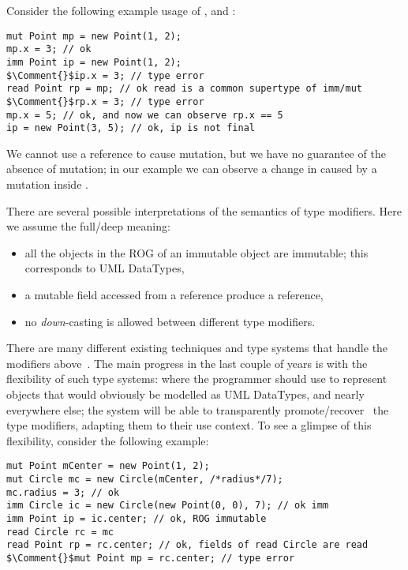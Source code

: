 \noindent Consider the following  example usage of \Q@mut@, \Q@imm@ and \Q@read@:
\begin{lstlisting}
mut Point mp = new Point(1, 2);
mp.x = 3; // ok
imm Point ip = new Point(1, 2);
$\Comment{}$ip.x = 3; // type error
read Point rp = mp; // ok read is a common supertype of imm/mut
$\Comment{}$rp.x = 3; // type error
mp.x = 5; // ok, and now we can observe rp.x == 5
ip = new Point(3, 5); // ok, ip is not final
\end{lstlisting}
\noindent We cannot use a \Q@read@ reference to cause mutation, but we have no guarantee of the absence of mutation; in our example we can observe a change in \Q@rp@ caused by a mutation inside \Q@mp@.


There are several possible interpretations of the semantics of type modifiers.
Here we assume the full/deep meaning:
\begin{itemize}
  \item all the objects in the ROG of an immutable object are immutable;
  this corresponds to UML DataTypes,
  \item a mutable field accessed from a \Q@read@ reference produce a \Q@read@ reference,
  \item no \emph{down}-casting is allowed between different type modifiers.
\end{itemize}


\noindent There are many different existing techniques and type systems that handle the modifiers above~\cite{ZibinEtAl10,ClarkeWrigstad03,HallerOdersky10,GordonEtAl12,ServettoZucca15}.
The main progress in the last couple of years is with the flexibility of such type systems: where the programmer should use \Q@imm@ to represent objects that would obviously be modelled as UML DataTypes, and \Q@mut@ nearly everywhere else; the system will be able to transparently promote/recover~\cite{GordonEtAl12,clebsch2015deny,ServettoZucca15} the type modifiers, adapting them to their use context.
To see a glimpse of this flexibility, consider the following example:
\saveSpace
\begin{lstlisting}
mut Point mCenter = new Point(1, 2);
mut Circle mc = new Circle(mCenter, /*radius*/7);
mc.radius = 3; // ok
imm Circle ic = new Circle(new Point(0, 0), 7); // ok imm
imm Point ip = ic.center; // ok, ROG immutable
read Circle rc = mc
read Point rp = rc.center; // ok, fields of read Circle are read
$\Comment{}$mut Point mp = rc.center; // type error
\end{lstlisting}
\saveSpace

